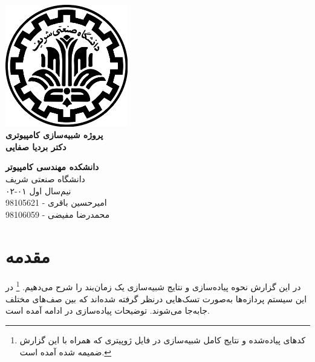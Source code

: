 \documentclass{article}
\begin{document}
\begin{titlepage}
	\begin{center}
		\vspace{0.2cm}
		
		\includegraphics[width=0.4\textwidth]{sharif.png}\\
		\vspace{0.5cm}
		\textbf{ \Huge{پروژه شبیه‌سازی کامپیوتری}}\\
		\vspace{0.25cm}
		\textbf{ \Large{دکتر بردیا صفایی}}
		\vspace{0.2cm}
		
		
		\large \textbf{دانشکده مهندسی کامپیوتر}\\\vspace{0.1cm}
		\large   دانشگاه صنعتی شریف\\\vspace{0.2cm}
		\large   ﻧﯿﻢ‌سال اول ۰۱-۰۲ \\\vspace{0.2cm}
		\large{\Large{امیرحسین باقری - 98105621}}\\
		\large{\Large{محمدرضا مفیضی - 98106059}}\\
	\end{center}
\end{titlepage}

\pagestyle{fancy}
\fancyhf{}
\fancyfoot{}
\setlength{\headheight}{59pt}
\cfoot{\thepage}

\section{مقدمه}
در این گزارش نحوه پیاده‌سازی و نتایج شبیه‌سازی یک زمان‌بند  را شرح می‌دهیم. \footnote{کدهای پیاده‌شده و نتایج کامل شبیه‌سازی در فایل ژوپیتری که همراه با این گزارش ضمیمه شده آمده است.}
در این سیستم پردازه‌ها به‌صورت تسک‌هایی درنظر گرفته شده‌اند که بین صف‌های مختلف جابه‌جا می‌شوند.
توضیحات پیاده‌سازی در ادامه آمده است.
\end{document}
